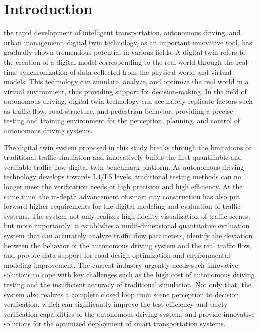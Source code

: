 \documentclass[journal,twoside,web]{ieeecolor}
\begin{document}
\section{Introduction}

 the rapid development of intelligent transportation, autonomous driving, and urban management, digital twin technology, as an important innovative tool, has gradually shown tremendous potential in various fields\cite{Alpher17}. 
A digital twin refers to the creation of a digital model corresponding to the real world through the real-time synchronization of data collected from the physical world and virtual models\cite{Alpher20c}. 
This technology can simulate, analyze, and optimize the real world in a virtual environment, thus providing support for decision-making\cite{Alpher21b}. 
In the field of autonomous driving, digital twin technology can accurately replicate factors such as traffic flow, road structure, and pedestrian behavior, providing a precise testing and training environment for the perception, planning, and control of autonomous driving systems\cite{Alpher24}\cite{Alpher20d}.

The digital twin system proposed in this study breaks through the limitations of traditional traffic simulation and innovatively builds the first quantifiable and verifiable traffic flow digital twin benchmark platform.
As autonomous driving technology develops towards L4/L5 levels, traditional testing methods can no longer meet the verification needs of high precision and high efficiency\cite{Alpher24b}.
At the same time, the in-depth advancement of smart city construction has also put forward higher requirements for the digital modeling and evaluation of traffic systems.
The system not only realizes high-fidelity visualization of traffic scenes, but more importantly, it establishes a multi-dimensional quantitative evaluation system that can accurately analyze traffic flow parameters, identify the deviation between the behavior of the autonomous driving system and the real traffic flow, and provide data support for road design optimization and environmental modeling improvement.
The current industry urgently needs such innovative solutions to cope with key challenges such as the high cost of autonomous driving testing and the insufficient accuracy of traditional simulation\cite{Alpher22c}.
Not only that, the system also realizes a complete closed loop from scene perception to decision verification, which can significantly improve the test efficiency and safety verification capabilities of the autonomous driving system, and provide innovative solutions for the optimized deployment of smart transportation systems\cite{Alpher17b}.
\end{document}
